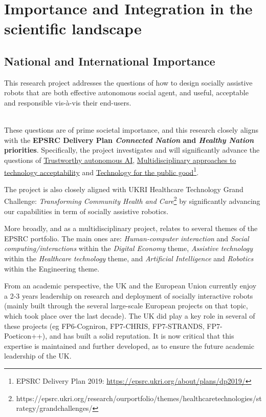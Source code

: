 \chapter{Importance and Integration in the scientific landscape}

\section{National and International Importance}

This research project addresses the questions of how to design socially
assistive robots that are both effective autonomous social agent, and useful,
acceptable and responsible vis-à-vis their end-users.

{\color{gray} \\
These questions are of prime societal importance, and this research closely
aligns with the \textbf{EPSRC Delivery Plan \emph{Connected Nation} and
\emph{Healthy Nation} priorities}. Specifically, the project
investigates and will significantly advance the questions of \ul{Trustworthy
autonomous AI}, \ul{Multidisciplinary approaches to technology acceptability}
and \ul{Technology for the public good}\footnote{EPSRC Delivery Plan 2019:
\url{https://epsrc.ukri.org/about/plans/dp2019/}}.

The project is also closely aligned with UKRI Healthcare Technology Grand
Challenge: \emph{Transforming Community Health and
Care}\footnote{https://epsrc.ukri.org/research/ourportfolio/themes/healthcaretechnologies/strategy/grandchallenges/}
by significantly advancing our capabilities in term of socially assistive
robotics.

More broadly, and as a multidisciplinary project, \project relates to several
themes of the EPSRC portfolio. The main ones are: \emph{Human-computer
interaction} and \emph{Social computing/interactions} within the \emph{Digital
Economy} theme, \emph{Assistive technology} within the \emph{Healthcare
technology} theme, and \emph{Artificial Intelligence} and \emph{Robotics} within
the Engineering theme.
}

From an academic perspective, the UK and the European Union currently enjoy a
2-3 years leadership on research and deployment of socially interactive robots
(mainly built through the several large-scale European projects on that topic,
which took place over the last decade). The UK did play a key role in several of
these projects (eg FP6-Cogniron, FP7-CHRIS, FP7-STRANDS, FP7-Poeticon++), and
has built a solid reputation. It is now critical that this expertise is
maintained and further developed, as to ensure the future academic leadership of
the UK.

